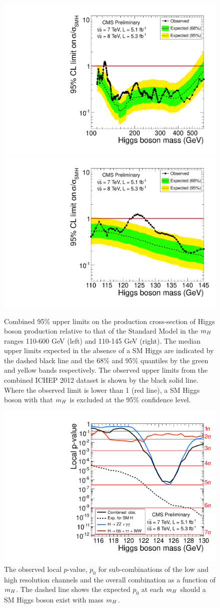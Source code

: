 \begin{figure}
\begin{center}
 \includegraphics[width=.49\textwidth]{combinations/ichep2012/Figure_004-a.pdf}
 \includegraphics[width=.49\textwidth]{combinations/ichep2012/Figure_004-b.pdf}
 \caption{Combined 95\% upper limits on the production cross-section of Higgs boson
production relative to that of the Standard Model in the $m_{H}$ ranges 110-600 GeV (left)
and 110-145 GeV (right). The median upper limits expected in the absence of a SM Higgs
are indicated by the dashed black line and the 68\% and 95\% quantiles by the green and yellow
bands respectively.
The observed upper limits from the combined ICHEP 2012 dataset is shown by the black solid line.
Where the observed limit is lower than 1 (red line), a SM Higgs boson with that $m_{H}$ 
is excluded at the 95\% confidence level.}
\label{fig:combinedexcl}
\end{center}
\end{figure}

\begin{figure}
\begin{center}
\includegraphics[width=.8\textwidth]{combinations/ichep2012/sqr_pvala_all_byresol.pdf}
\caption{The observed local $p$-value, $p_{0}$ for sub-combinations of the low and
high resolution channels and the overall combination as a function of $m_{H}$. The dashed
line shows the expected $p_{0}$ at each $m_{H}$ should a SM Higgs boson exist with mass $m_{H}$.}
\label{fig:combinedpval}
\end{center}
\end{figure}


